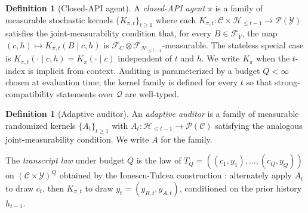 \documentclass{article}
\theoremstyle{plain}
\theoremstyle{definition}
\newtheorem{definition}[theorem]{Definition}
\theoremstyle{remark}
\newcommand{\C}{\mathcal{C}}
\newcommand{\Y}{\mathcal{Y}}
\newcommand{\Hist}{\mathcal{H}}
\begin{document}
\begin{definition}[Closed-API agent]\label{def:agent}
A \emph{closed-API agent} $\pi$ is a family of measurable stochastic kernels
$\{K_{\pi, t}\}_{t \ge 1}$ where each
$K_{\pi, t} : \C \times \Hist_{\le t-1} \to \mathcal{P}(\Y)$ satisfies the
joint-measurability condition that, for every $B \in \mathcal F_Y$, the
map $(c, h) \mapsto K_{\pi, t}(B \mid c, h)$ is
$\mathcal F_C \otimes \mathcal F_{\Hist_{\le t-1}}$-measurable. The
stateless special case is $K_{\pi, t}(\cdot \mid c, h) = K_\pi(\cdot \mid c)$
independent of $t$ and $h$. We write $K_\pi$ when the $t$-index is
implicit from context. Auditing is parameterized by a budget $Q < \infty$
chosen at evaluation time; the kernel family is defined for every $t$ so
that strong-compatibility statements over $\mathcal Q$ are well-typed.
\end{definition}

\begin{definition}[Adaptive auditor]\label{def:auditor}
An \emph{adaptive auditor} is a family of measurable randomized kernels
$\{A_t\}_{t \ge 1}$ with $A_t : \Hist_{\le t-1} \to \mathcal{P}(\C)$
satisfying the analogous joint-measurability condition. We write $A$ for
the family.
\end{definition}

The \emph{transcript law} under budget $Q$ is the law of
$T_Q = ((c_1, y_1), \ldots, (c_Q, y_Q))$ on $(\C \times \Y)^Q$ obtained
by the Ionescu-Tulcea construction
\citep[Theorem~6.16]{kallenberg2021}: alternately apply $A_t$ to draw
$c_t$, then $K_{\pi, t}$ to draw $y_t = (y_{R, t}, y_{A, t})$, conditioned
on the prior history $h_{t-1}$.
\end{document}
